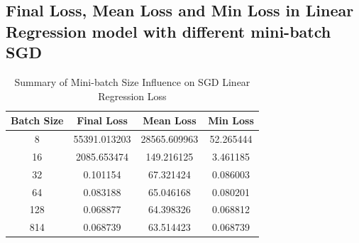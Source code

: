 \documentclass{article}
\begin{document}
\begin{appendices}
\subsection{Final Loss, Mean Loss and Min Loss in Linear Regression model with different mini-batch SGD} \label{app:loss-history-sgd-log}
\begin{table}[h!]
    \centering
    \begin{tabular}{|c|c|c|c|}
        \hline
        \textbf{Batch Size} & \textbf{Final Loss} & \textbf{Mean Loss} & \textbf{Min Loss} \\
        \hline
        8   & 55391.013203 & 28565.609963 & 52.265444  \\
        16  & 2085.653474  & 149.216125   & 3.461185   \\
        32  & 0.101154     & 67.321424    & 0.086003   \\
        64  & 0.083188     & 65.046168    & 0.080201   \\
        128 & 0.068877     & 64.398326    & 0.068812   \\
        814 & 0.068739     & 63.514423    & 0.068739   \\
        \hline
    \end{tabular}
    \vspace{7pt}
    \caption{Summary of Mini-batch Size Influence on SGD Linear Regression Loss}
    \label{tab:sgd_loss}
\end{table}


\end{appendices}
\end{document}
